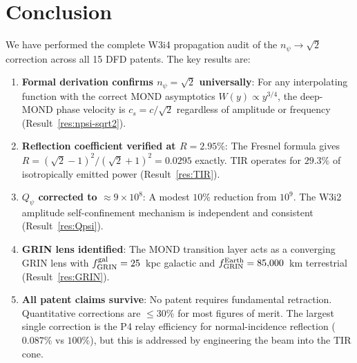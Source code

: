 \documentclass[aps,prd,twocolumn,superscriptaddress]{revtex4-2}
\newcommand{\Qpsi}{Q_\psi}
\newcommand{\npsi}{n_\psi}
\newcommand{\ee}[1]{\times 10^{#1}}
\begin{document}
\section{Conclusion}
\label{sec:conclusion}

We have performed the complete W3i4 propagation audit of the
$\npsi \to \sqrt{2}$ correction across all 15 DFD patents.  The key
results are:

\begin{enumerate}
  \item \textbf{Formal derivation confirms $\npsi = \sqrt{2}$ universally}:
    For any interpolating function with the correct MOND asymptotics
    $W(y) \propto y^{3/4}$, the deep-MOND phase velocity is
    $c_s = c/\sqrt{2}$ regardless of amplitude or frequency
    (Result~\ref{res:npsi-sqrt2}).

  \item \textbf{Reflection coefficient verified at $R = 2.95\%$}:
    The Fresnel formula gives $R = (\sqrt{2}-1)^2/(\sqrt{2}+1)^2 = 0.0295$
    exactly.  TIR operates for $29.3\%$ of isotropically emitted power
    (Result~\ref{res:TIR}).

  \item \textbf{$\Qpsi$ corrected to $\approx 9\ee8$}: A modest $10\%$
    reduction from $10^9$.  The W3i2 amplitude self-confinement mechanism
    is independent and consistent (Result~\ref{res:Qpsi}).

  \item \textbf{GRIN lens identified}: The MOND transition layer acts as
    a converging GRIN lens with $f_{\rm GRIN}^{\rm gal} = 25$~kpc galactic
    and $f_{\rm GRIN}^{\rm Earth} = 85{,}000$~km terrestrial
    (Result~\ref{res:GRIN}).

  \item \textbf{All patent claims survive}: No patent requires fundamental
    retraction.  Quantitative corrections are $\leq 30\%$ for most
    figures of merit.  The largest single correction is the P4 relay
    efficiency for normal-incidence reflection ($0.087\%$ vs $100\%$),
    but this is addressed by engineering the beam into the TIR cone.
\end{enumerate}
\end{document}
